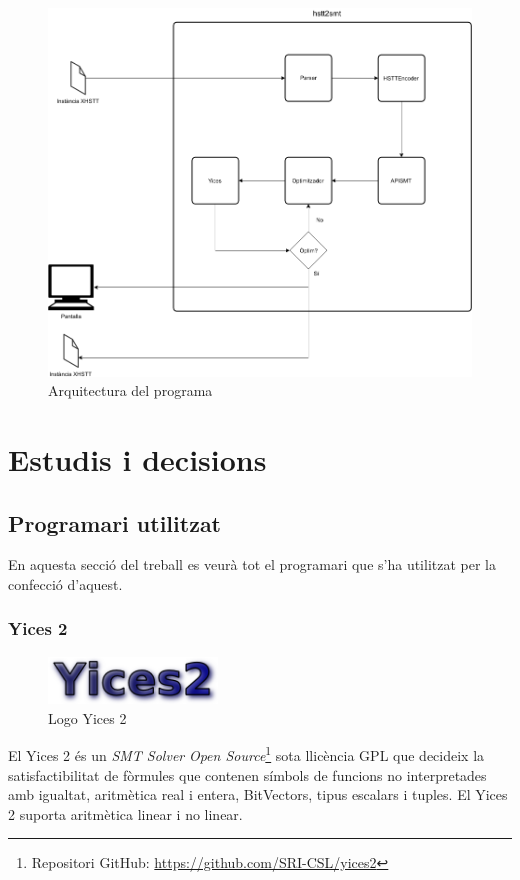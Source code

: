 \documentclass[11pt,a4paper,twoside]{report}
\begin{document}
 \begin{figure}[ht!]
  \includegraphics[width=\textwidth]{Diagrames/Arqui1.png}
  \caption{Arquitectura del programa}
  \label{fig:Arqui1}
\end{figure}
 

  \chapter{Estudis i decisions}
  \section{Programari utilitzat}
  En aquesta secció del treball es veurà tot el programari que s'ha utilitzat per la confecció d'aquest.
  \subsection{Yices 2}
  \begin{figure}[ht!]
    \centering
    \includegraphics[width=0.4\textwidth]{Diagrames/logoYices.png}
    \caption{Logo Yices 2}
    \label{fig:yices}
  \end{figure}
  El Yices 2 és un \textit{SMT Solver} \textit{Open Source}\footnote{Repositori GitHub: \url{https://github.com/SRI-CSL/yices2}} sota llicència GPL que decideix la satisfactibilitat de fòrmules que contenen símbols de funcions no interpretades amb igualtat, aritmètica real i entera, BitVectors, tipus escalars i tuples. El Yices 2 suporta aritmètica linear i no linear.
  
\end{document}
